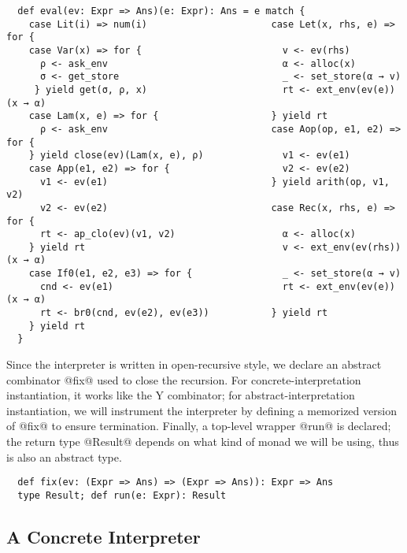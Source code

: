 \begin{lstlisting}
  def eval(ev: Expr => Ans)(e: Expr): Ans = e match {
    case Lit(i) => num(i)                      case Let(x, rhs, e) => for {
    case Var(x) => for {                         v <- ev(rhs)
      ρ <- ask_env                               α <- alloc(x)
      σ <- get_store                             _ <- set_store(α → v)
     } yield get(σ, ρ, x)                        rt <- ext_env(ev(e))(x → α)
    case Lam(x, e) => for {                    } yield rt
      ρ <- ask_env                             case Aop(op, e1, e2) => for {
    } yield close(ev)(Lam(x, e), ρ)              v1 <- ev(e1)                                               
    case App(e1, e2) => for {                    v2 <- ev(e2)
      v1 <- ev(e1)                             } yield arith(op, v1, v2)
      v2 <- ev(e2)                             case Rec(x, rhs, e) => for {
      rt <- ap_clo(ev)(v1, v2)                   α <- alloc(x)
    } yield rt                                   v <- ext_env(ev(rhs))(x → α)
    case If0(e1, e2, e3) => for {                _ <- set_store(α → v)
      cnd <- ev(e1)                              rt <- ext_env(ev(e))(x → α)
      rt <- br0(cnd, ev(e2), ev(e3))           } yield rt                    
    } yield rt
  }
\end{lstlisting}

Since the interpreter is written in open-recursive style, we declare an abstract
combinator @fix@ used to close the recursion. For concrete-interpretation instantiation, it
works like the Y combinator; for abstract-interpretation instantiation, we will
instrument the interpreter by defining a memorized version of @fix@ to ensure
termination. Finally, a top-level wrapper @run@ is declared; the return type
@Result@ depends on what kind of monad we will be using, thus is also an abstract type.

\begin{lstlisting}
  def fix(ev: (Expr => Ans) => (Expr => Ans)): Expr => Ans
  type Result; def run(e: Expr): Result
\end{lstlisting}


\subsection{A Concrete Interpreter} \label{unstaged_conc}

